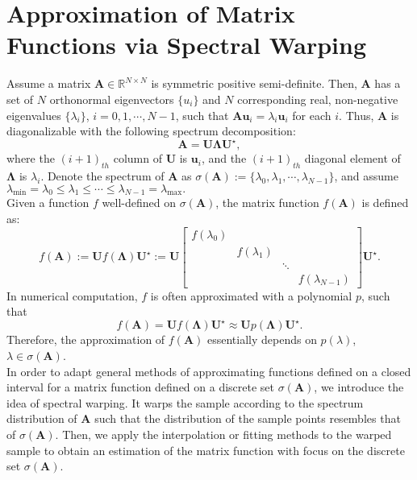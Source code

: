 \documentclass[11pt,letter]{article}
\begin{document}
\section{Approximation of Matrix Functions via Spectral Warping}

Assume a matrix $\mathbf{A}\in 
\mathbb{R}^{N\times N}$ is symmetric positive semi-definite. Then, $\mathbf{A}$ has a set of $N$ orthonormal eigenvectors $\{u_i\}$ and $N$ corresponding real, non-negative eigenvalues $\{\lambda_i\}$, $i=0,1,\cdots,N-1$, such that $\mathbf{A}\mathbf{u}_i=\lambda_i\mathbf{u}_i$ for each $i$. Thus, $\mathbf{A}$ is diagonalizable with the following spectrum decomposition: 
$$\mathbf{A}=\mathbf{U}\mathbf{\Lambda} \mathbf{U}^{\star},$$ where the $(i+1)_{th}$
column of $\mathbf{U}$ is $\mathbf{u}_i$, and the $(i+1)_{th}$ diagonal element of $\mathbf{\Lambda}$ is $\lambda_i$. Denote the spectrum of $\mathbf{A}$ as $\sigma(\mathbf{A}):=\{\lambda _0,\lambda _1,\cdots, \lambda _{N-1}\}$, and assume $\lambda_{\min}=\lambda _0\leq\lambda _1\leq \cdots\leq\lambda _{N-1}=\lambda_{\max}.$\\

Given a function $f$ well-defined on $\sigma(\mathbf{A})$, the matrix function $f(\mathbf{A})$ is defined as:
\begin{equation}
f(\mathbf{A}):=\mathbf{U}f(\mathbf{\Lambda})\mathbf{U}^{\star}:=\mathbf{U}\left[\begin{array}{cccc}
f(\lambda_0) &&&\\
&f(\lambda_1)&&\\
&&\ddots&\\
&&&f(\lambda_{N-1})
\end{array}\right]\mathbf{U}^{\star}.
\end{equation}
In numerical computation, $f$ is often approximated with a polynomial $p$, such that $$f(\mathbf{A})=\mathbf{U}f(\mathbf{\Lambda})\mathbf{U}^{\star}\approx \mathbf{U}p(\mathbf{\Lambda})\mathbf{U}^{\star}.$$ Therefore, the approximation of $f(\mathbf{A})$ essentially depends on $p(\lambda)$, $\lambda\in\sigma(\mathbf{A})$.\\ 

In order to adapt general methods of approximating functions defined on a closed interval for a matrix function defined on a discrete set $\sigma(\mathbf{A})$, we introduce the idea of spectral warping. It warps the sample according to the spectrum distribution of $\mathbf{A}$  such that the distribution of the sample points resembles that of $\sigma(\mathbf{A})$. Then, we apply the interpolation or fitting methods to the warped sample to obtain an estimation of the matrix function with focus on the discrete set $\sigma(\mathbf{A})$.\\ 
\end{document}
